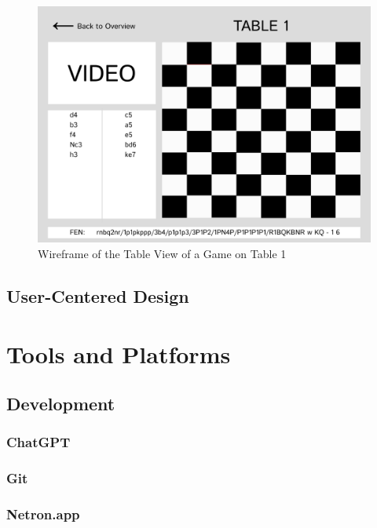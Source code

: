 \begin{figure}[h!]
    \centering
    \includegraphics[width=0.75\linewidth]{figures/wireframe/table-view.png}
    \caption{Wireframe of the Table View of a Game on Table 1}
    \label{fig:app-table-view}
\end{figure}


\subsection{User-Centered Design}



\section{Tools and Platforms}



\subsection{Development}

\subsubsection*{ChatGPT}



\subsubsection*{Git}



\subsubsection*{Netron.app}



